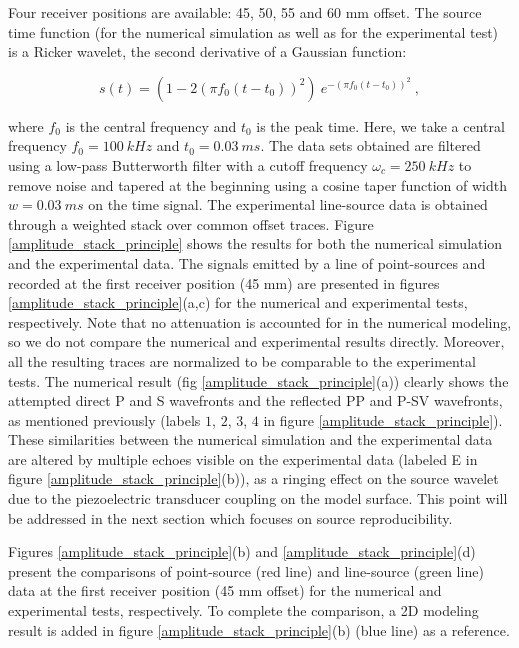 \documentclass[paper,extra]{gji} %
\begin{document}
Four receiver positions are available: 45, 50, 55 and 60 mm offset. The source time function (for the numerical simulation as well as for the experimental test) is a Ricker wavelet, the second derivative of a Gaussian function:

\begin{equation}
s(t) = (1-2(\pi f_{0}(t-t_{0}))^{2})~e^{-(\pi f_{0}(t-t_{0}))^{2}}~,
\label{eq:ricker-source} 
\end{equation}

\noindent where $f_{0}$ is the central frequency and $t_{0}$ is the peak time. Here, we take a central frequency $f_{0}=100\ kHz$ and $t_{0}=0.03\ ms$. The data sets obtained are filtered using a low-pass Butterworth filter with a cutoff frequency $\omega_{c}=250\ kHz$ to remove noise and tapered at the beginning using a cosine taper function of width $w=0.03\ ms$ on the time signal. The experimental line-source data is obtained through a weighted stack over common offset traces. Figure \ref{amplitude_stack_principle} shows the results for both the numerical simulation and the experimental data. The signals emitted by a line of point-sources and recorded at the first receiver position (45 mm) are presented in figures \ref{amplitude_stack_principle}(a,c) for the numerical and experimental tests, respectively. Note that no attenuation is accounted for in the numerical modeling, so we do not compare the numerical and experimental results directly. Moreover, all the resulting traces are normalized to be comparable to the experimental tests. The numerical result (fig \ref{amplitude_stack_principle}(a)) clearly shows the attempted direct P and S wavefronts and the reflected PP and P-SV wavefronts, as mentioned previously (labels $1$, $2$, $3$, $4$ in figure \ref{amplitude_stack_principle}). These similarities between the numerical simulation and the experimental data are altered by multiple echoes visible on the experimental data (labeled E in figure \ref{amplitude_stack_principle}(b)), as a ringing effect on the source wavelet due to the piezoelectric transducer coupling on the model surface. This point will be addressed in the next section which focuses on source reproducibility. 

\noindent Figures \ref{amplitude_stack_principle}(b) and \ref{amplitude_stack_principle}(d) present the comparisons of point-source (red line) and line-source (green line) data at the first receiver position (45 mm offset) for the numerical and experimental tests, respectively. To complete the comparison, a 2D modeling result is added in figure \ref{amplitude_stack_principle}(b) (blue line) as a reference.
\end{document}
